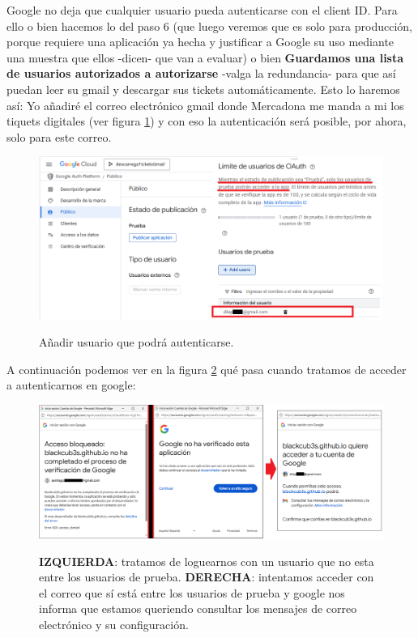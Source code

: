 \documentclass[a4paper,12pt]{report}
\begin{document}
	Google no deja que cualquier usuario pueda autenticarse con el client ID. Para ello o bien hacemos lo del paso 6 (que luego veremos que es solo para producción, porque requiere una aplicación ya hecha y justificar a Google su uso mediante una muestra que ellos -dicen- que van a evaluar) o bien \textbf{Guardamos una lista de usuarios autorizados a autorizarse} -valga la redundancia- para que así puedan leer su gmail y descargar sus tickets automáticamente. Esto lo haremos así: Yo añadiré el correo electrónico gmail donde Mercadona me manda a mi los tiquets digitales (ver figura \ref{fig:googleCloudB}) y con eso la autenticación será posible, por ahora, solo para este correo.
	
	\FloatBarrier
	\setlength{\belowcaptionskip}{3pt}
	\begin{figure}[H]
		\centering
		\caption{Añadir usuario que podrá autenticarse.}
		\includegraphics[width=1\linewidth]{img/googleCloudB}
		\label{fig:googleCloudB}
	\end{figure}
	\FloatBarrier
	
	A continuación podemos ver en la figura \ref{fig:googleCloudI} qué pasa cuando tratamos de acceder a autenticarnos en google:
	
	
	
	
	\FloatBarrier
	\setlength{\belowcaptionskip}{3pt}
	\begin{figure}[H]
		\centering
		\caption{\textbf{IZQUIERDA}: tratamos de loguearnos con un usuario que no esta entre los usuarios de prueba. \textbf{DERECHA}: intentamos acceder con el correo que sí está entre los usuarios de prueba y google nos informa que estamos queriendo consultar los mensajes de correo electrónico y su configuración.}
		\includegraphics[width=1\linewidth]{img/googleCloudI}
		\label{fig:googleCloudI}
	\end{figure}
	\FloatBarrier
	
\end{document}
